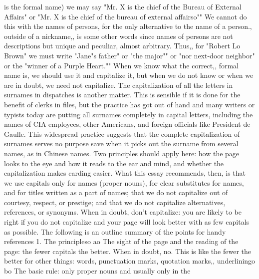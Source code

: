 \documentclass[
    oneside,
    11pt,
    draft
]{memoir}
\begin{document}
is the formal name) we may say "Mr. X is the chief of the Bureau of External Affairs" or "Mr. X is the chief of the bureau of external affairso"" We cannot do this with the names of persons, for the only alternative to the name of a person., outside of a nickname,, is some other words since names of persons are not descriptions but unique and peculiar, almost arbitrary. Thus,, for "Robert Lo Brown" we must write "Jane"s father" or "the major"" or "nor next-door neighbor" or the "winner of a Purple Heart."" When we know what the correct,, formal name is, we should use it and capitalize it, but when we do not know or when we are in doubt, we need not capitalize. The capitalization of all the letters in surnames in dispatches is another matter. This is sensible if it is done for the benefit of clerks in files, but the practice has got out of hand and many writers or typists today are putting all surnames completely in capital letters, including the names of CIA employees, other Americans, and foreign officials like President de Gaulle. This widespread practice suggests that the complete capitalization of surnames serves no purpose save when it picks out the surname from several names, as in Chinese names. Two principles should apply here: how the page looks to the eye and how it reads to the ear and mind, and whether the capitalization makes carding easier. What this essay recommends, then, is that we use capitals only for names (proper nouns), for clear substitutes for names, and for titles written as a part of names; that we do not capitalize out of courtesy, respect, or prestige; and that we do not capitalize alternatives, references, or synonyms. When in doubt, don't capitalize: you are likely to be right if you do not capitalize and your page will look better with as few capitals as possible. The following is an outline summary of the points for handy references 1. The principleso ao The sight of the page and the reading of the page: the fewer capitals the better. When in doubt, no. This is like the fewer the better for other things: words, punctuation marks, quotation marks,, underliningo bo The basic rule: only proper nouns and usually only in the
\end{document}
